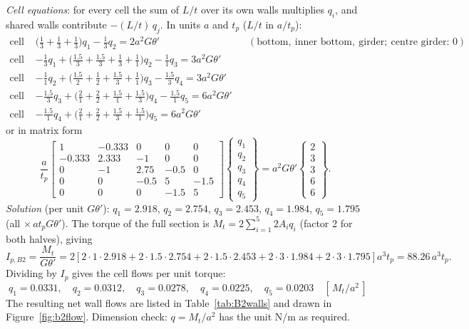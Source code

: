 \emph{Cell equations}: for every cell the sum of $L/t$ over its own walls multiplies $q_i$, and shared walls contribute $-(L/t)\,q_j$. In units $a$ and $t_p$ ($L/t$ in $a/t_p$):
\begin{align*}
  \text{cell 1: } & \Big(\tfrac{1}{3}+\tfrac{1}{3}+\tfrac{1}{3}\Big)q_1-\tfrac{1}{3}q_2 = 2a^2G\theta' & &(\text{bottom},\ \text{inner bottom},\ \text{girder};\ \text{centre girder: } 0)\\
  \text{cell 2: } & -\tfrac{1}{3}q_1+\Big(\tfrac{1.5}{3}+\tfrac{1.5}{3}+\tfrac{1}{3}+\tfrac{1}{1}\Big)q_2-\tfrac{1}{1}q_3 = 3a^2G\theta'\\
  \text{cell 3: } & -\tfrac{1}{1}q_2+\Big(\tfrac{1.5}{2}+\tfrac{1}{2}+\tfrac{1.5}{3}+\tfrac{1}{1}\Big)q_3-\tfrac{1.5}{3}q_4 = 3a^2G\theta'\\
  \text{cell 4: } & -\tfrac{1.5}{3}q_3+\Big(\tfrac{2}{1}+\tfrac{2}{2}+\tfrac{1.5}{1}+\tfrac{1.5}{3}\Big)q_4-\tfrac{1.5}{1}q_5 = 6a^2G\theta'\\
  \text{cell 5: } & -\tfrac{1.5}{1}q_4+\Big(\tfrac{2}{1}+\tfrac{2}{2}+\tfrac{1.5}{3}+\tfrac{1.5}{1}\Big)q_5 = 6a^2G\theta'
\end{align*}
or in matrix form
\begin{equation}
  \frac{a}{t_p}\begin{bmatrix} 1 & -0.333 & 0 & 0 & 0\\ -0.333 & 2.333 & -1 & 0 & 0\\ 0 & -1 & 2.75 & -0.5 & 0\\ 0 & 0 & -0.5 & 5 & -1.5\\ 0&0&0&-1.5&5\end{bmatrix}
  \begin{Bmatrix}q_1\\q_2\\q_3\\q_4\\q_5\end{Bmatrix}
  = a^2G\theta'\begin{Bmatrix}2\\3\\3\\6\\6\end{Bmatrix}.
\end{equation}
\emph{Solution} (per unit $G\theta'$): $q_1=2.918$, $q_2=2.754$, $q_3=2.453$, $q_4=1.984$, $q_5=1.795$ (all $\times\,at_pG\theta'$). The torque of the full section is $M_t=2\sum_{i=1}^{5}2A_iq_i$ (factor 2 for both halves), giving
\begin{equation}
  I_{p,B2}=\frac{M_t}{G\theta'}=2\left[2\cdot1\cdot2.918+2\cdot1.5\cdot2.754+2\cdot1.5\cdot2.453+2\cdot3\cdot1.984+2\cdot3\cdot1.795\right]a^3t_p=88.26\,a^3t_p .
\end{equation}
Dividing by $I_p$ gives the cell flows per unit torque:
\begin{equation}
  \boxed{\;q_1=0.0331,\quad q_2=0.0312,\quad q_3=0.0278,\quad q_4=0.0225,\quad q_5=0.0203\quad[\,M_t/a^2\,]\;}
\end{equation}
The resulting net wall flows are listed in Table~\ref{tab:B2walls} and drawn in Figure~\ref{fig:b2flow}. Dimension check: $q=M_t/a^2$ has the unit N/m as required.

